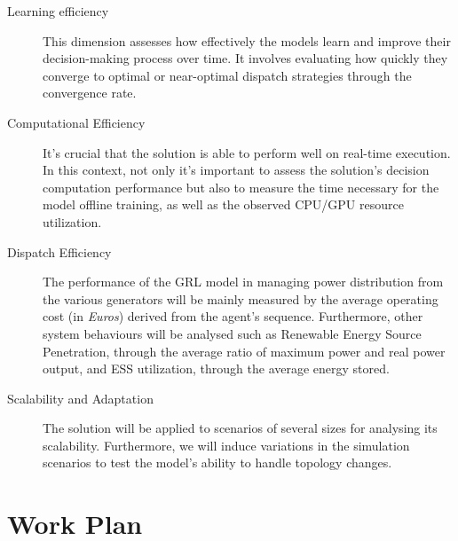 \begin{description}
	\item[Learning efficiency] This dimension assesses how effectively the models learn and improve their decision-making process over time. It involves evaluating how quickly they converge to optimal or near-optimal dispatch strategies through the convergence rate. 
	
	\item[Computational Efficiency] It's crucial that the solution is able to perform well on real-time execution. In this context, not only it's important to assess the solution's decision computation performance but also to measure the time necessary for the model offline training, as well as the observed CPU/GPU resource utilization.
	
	\item[Dispatch Efficiency] The performance of the \ac{GRL} model in managing power distribution from the various generators will be mainly measured by the average operating cost (in \textit{Euros}) derived from the agent's sequence. Furthermore, other system behaviours will be analysed such as Renewable Energy Source Penetration, through the average ratio of maximum power and real power output, and \ac{ESS} utilization, through the average energy stored.
	
	\item[Scalability and Adaptation]  The solution will be applied to scenarios of several sizes for analysing its scalability. Furthermore, we will induce variations in the simulation scenarios to test the model's ability to handle topology changes.
\end{description}

\section{Work Plan} \label{sec:work-plan}


